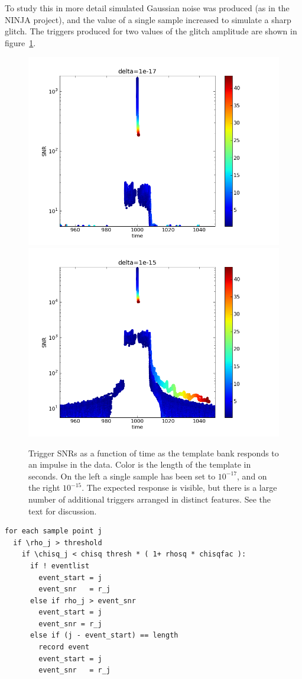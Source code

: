 To study this in more detail simulated Gaussian noise was produced (as
in the NINJA project), and the value of a single sample increased to
simulate a sharp glitch.  The triggers produced for two values of the
glitch amplitude are shown in
figure~\ref{f:impulses_original_no_chisq}.

\begin{figure}
  \includegraphics[width=0.5\linewidth]{figures/detchar/raw1_1e-17}
  \includegraphics[width=0.5\linewidth]{figures/detchar/raw1_1e-15}
  \caption[Response of the template bank to an impulse] {
  \label{f:impulses_original_no_chisq}
Trigger SNRs as a function of time as the template bank responds to an
impulse in the data.  Color is the length of the template in seconds.
On the left a single sample has been set to $10^{-17}$, and on the
right $10^{-15}$.  The expected response is visible, but there is a
large number of additional triggers arranged in distinct features.
See the text for discussion.
}
\end{figure}%

\begin{verbatim}
for each sample point j
  if \rho_j > threshold
    if \chisq_j < chisq thresh * ( 1+ rhosq * chisqfac ):
      if ! eventlist
        event_start = j
        event_snr   = r_j
      else if rho_j > event_snr
        event_start = j
        event_snr = r_j
      else if (j - event_start) == length
        record event
        event_start = j
        event_snr   = r_j
\end{verbatim}

